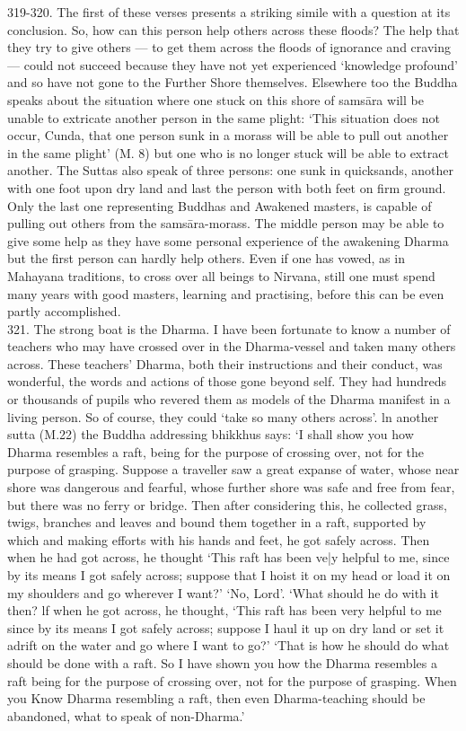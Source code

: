 319-320. The first of these verses presents a striking simile with a question at its conclusion. So, how can this person help others across these floods? The help that they try to give others — to get them across the floods of ignorance and craving — could not succeed because they have not yet experienced `knowledge profound' and so have not gone to the Further Shore themselves. Elsewhere too the Buddha speaks about the situation where one stuck on this shore of sams\=ara will be unable to extricate another person in the same plight: `This situation does not occur, Cunda, that one person sunk in a morass will be able to pull out another in the same plight' (M. 8) but one who is no longer stuck will be able to extract another. The Suttas also speak of three persons: one sunk in quicksands, another with one foot upon dry land and last the person with both feet on firm ground. Only the last one representing Buddhas and Awakened masters, is capable of pulling out others from the sams\=ara-morass. The middle person may be able to give some help as they have some personal experience of the awakening Dharma but the first person can hardly help others. Even if one has vowed, as in Mahayana traditions, to cross over all beings to Nirvana, still one must spend many years with good masters, learning and practising, before this can be even partly accomplished.\\


321. The strong boat is the Dharma. I have been fortunate to know a number of teachers who may have crossed over in the Dharma-vessel and taken many others across. These teachers' Dharma, both their instructions and their conduct, was wonderful, the words and actions of those gone beyond self. They had hundreds or thousands of pupils who revered them as models of the Dharma manifest in a living person. So of course, they could `take so many others across'. ln another sutta (M.22) the Buddha addressing bhikkhus says: `I shall show you how Dharma resembles a raft, being for the purpose of crossing over, not for the purpose of grasping. Suppose a traveller saw a great expanse of water, whose near shore was dangerous and fearful, whose further shore was safe and free from fear, but there was no ferry or bridge. Then after considering this, he collected grass, twigs, branches and leaves and bound them together in a raft, supported by which and making efforts with his hands and feet, he got safely across. Then when he had got across, he thought `This raft has been ve|y helpful to me, since by its means I got safely across; suppose that I hoist it on my head or load it on my shoulders and go wherever I want?' `No, Lord'. `What should he do with it then? lf when he got across, he thought, `This raft has been very helpful to me since by its means I got safely across; suppose I haul it up on dry land or set it adrift on the water and go where I want to go?' `That is how he should do what should be done with a raft. So I have shown you how the Dharma resembles a raft being for the purpose of crossing over, not for the purpose of grasping. When you Know Dharma resembling a raft, then even Dharma-teaching should be abandoned, what to speak of non-Dharma.' \\

